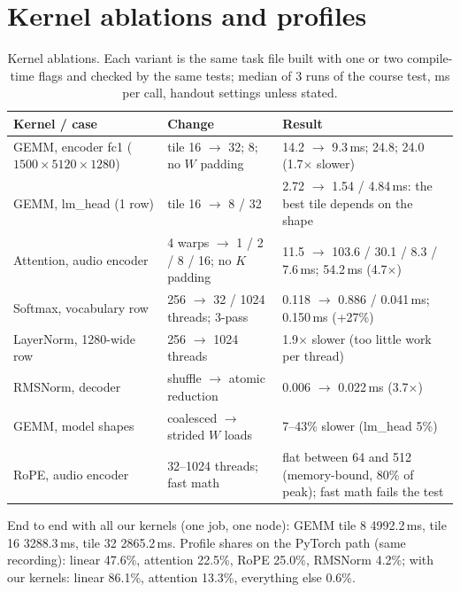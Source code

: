 \documentclass{article}
\begin{document}
\section{Kernel ablations and profiles}
\label{app:ablations}
\begin{table}[h]
\caption{Kernel ablations. Each variant is the same task file built with one or two compile-time flags and checked by the same tests; median of 3 runs of the course test, ms per call, handout settings unless stated.}
\begin{center}
\small
\begin{tabular}{p{3.6cm}p{3.4cm}p{5.6cm}}
\toprule
Kernel / case & Change & Result\\
\midrule
GEMM, encoder fc1 ($1500\times5120\times1280$) & tile 16 $\to$ 32; 8; no $W$ padding & 14.2 $\to$ 9.3\,ms; 24.8; 24.0 (1.7$\times$ slower)\\
GEMM, lm\_head (1 row) & tile 16 $\to$ 8 / 32 & 2.72 $\to$ 1.54 / 4.84\,ms: the best tile depends on the shape\\
Attention, audio encoder & 4 warps $\to$ 1 / 2 / 8 / 16; no $K$ padding & 11.5 $\to$ 103.6 / 30.1 / 8.3 / 7.6\,ms; 54.2\,ms (4.7$\times$)\\
Softmax, vocabulary row & 256 $\to$ 32 / 1024 threads; 3-pass & 0.118 $\to$ 0.886 / 0.041\,ms; 0.150\,ms (+27\%)\\
LayerNorm, 1280-wide row & 256 $\to$ 1024 threads & 1.9$\times$ slower (too little work per thread)\\
RMSNorm, decoder & shuffle $\to$ atomic reduction & 0.006 $\to$ 0.022\,ms (3.7$\times$)\\
GEMM, model shapes & coalesced $\to$ strided $W$ loads & 7--43\% slower (lm\_head 5\%)\\
RoPE, audio encoder & 32--1024 threads; fast math & flat between 64 and 512 (memory-bound, 80\% of peak); fast math fails the test\\
\bottomrule
\end{tabular}
\end{center}
\end{table}

\noindent End to end with all our kernels (one job, one node): GEMM tile 8 4992.2\,ms, tile 16 3288.3\,ms, tile 32 2865.2\,ms. Profile shares on the PyTorch path (same recording): linear 47.6\%, attention 22.5\%, RoPE 25.0\%, RMSNorm 4.2\%; with our kernels: linear 86.1\%, attention 13.3\%, everything else 0.6\%.

\FloatBarrier
\end{document}
